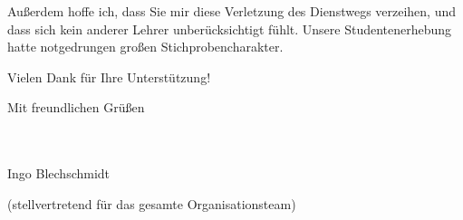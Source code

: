 \documentclass{zirkelbrief}
\begin{document}
Außerdem hoffe ich, dass Sie mir diese Verletzung des Dienstwegs verzeihen, und
dass sich kein anderer Lehrer unberücksichtigt fühlt. Unsere Studentenerhebung
hatte notgedrungen großen Stichprobencharakter.

Vielen Dank für Ihre Unterstützung!

Mit freundlichen Grüßen

\ \\
\ \\

Ingo Blechschmidt

\vspace{-0.2cm}

{\small (stellvertretend für das gesamte Organisationsteam)}
\end{document}

